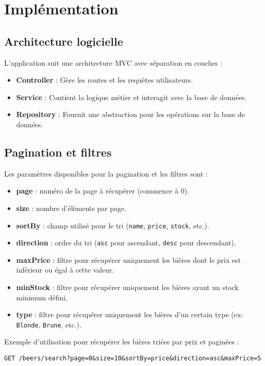 \documentclass{article}
\begin{document}
\section{Implémentation}

\subsection{Architecture logicielle}
L'application suit une architecture MVC avec séparation en couches :
\begin{itemize}
    \item \textbf{Controller} : Gère les routes et les requêtes utilisateurs.
    \item \textbf{Service} : Contient la logique métier et interagit avec la base de données.
    \item \textbf{Repository} : Fournit une abstraction pour les opérations sur la base de données.
\end{itemize}


\subsection{Pagination et filtres}
Les paramètres disponibles pour la pagination et les filtres sont :
\begin{itemize}
    \item \textbf{page} : numéro de la page à récupérer (commence à 0).
    \item \textbf{size} : nombre d'éléments par page.
    \item \textbf{sortBy} : champ utilisé pour le tri (\texttt{name}, \texttt{price}, \texttt{stock}, etc.).
    \item \textbf{direction} : ordre du tri (\texttt{asc} pour ascendant, \texttt{desc} pour descendant).
    \item \textbf{maxPrice} : filtre pour récupérer uniquement les bières dont le prix est inférieur ou égal à cette valeur.
    \item \textbf{minStock} : filtre pour récupérer uniquement les bières ayant un stock minimum défini.
    \item \textbf{type} : filtre pour récupérer uniquement les bières d'un certain type (ex: \texttt{Blonde}, \texttt{Brune}, etc.).
\end{itemize}

Exemple d'utilisation pour récupérer les bières triées par prix et paginées :
\begin{verbatim}
GET /beers/search?page=0&size=10&sortBy=price&direction=asc&maxPrice=5
\end{verbatim}
\end{document}
